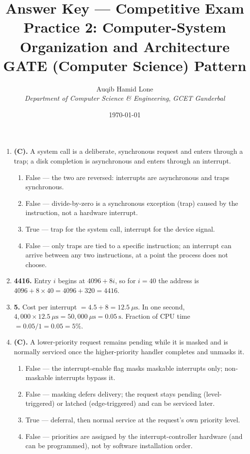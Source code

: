 \documentclass[11pt]{article}
\title{Answer Key --- Competitive Exam Practice 2: Computer-System Organization and Architecture\\\large GATE (Computer Science) Pattern}
\author{Auqib Hamid Lone\\[0.3em]
  \emph{Department of Computer Science \& Engineering}, \emph{GCET Ganderbal}}
\date{\today}
\begin{document}
\maketitle

\begin{enumerate}
\item[\textbf{Q1}] \textbf{(C).} A system call is a deliberate, synchronous request and enters through a trap; a disk completion is asynchronous and enters through an interrupt.

\begin{enumerate}
  \item[(A)] False --- the two are reversed: interrupts are asynchronous and traps synchronous.
  \item[(B)] False --- divide-by-zero is a synchronous exception (trap) caused by the instruction, not a hardware interrupt.
  \item[(C)] True --- trap for the system call, interrupt for the device signal.
  \item[(D)] False --- only traps are tied to a specific instruction; an interrupt can arrive between any two instructions, at a point the process does not choose.
\end{enumerate}

\item[\textbf{Q2}] \textbf{4416.} Entry $i$ begins at $4096 + 8i$, so for $i = 40$ the address is $4096 + 8 \times 40 = 4096 + 320 = 4416$.

\item[\textbf{Q3}] \textbf{5.} Cost per interrupt $= 4.5 + 8 = 12.5\ \mu\text{s}$. In one second, $4{,}000 \times 12.5\ \mu\text{s} = 50{,}000\ \mu\text{s} = 0.05\ \text{s}$. Fraction of CPU time $= 0.05/1 = 0.05 = 5\%$.

\item[\textbf{Q4}] \textbf{(C).} A lower-priority request remains pending while it is masked and is normally serviced once the higher-priority handler completes and unmasks it.

\begin{enumerate}
  \item[(A)] False --- the interrupt-enable flag masks maskable interrupts only; non-maskable interrupts bypass it.
  \item[(B)] False --- masking defers delivery; the request stays pending (level-triggered) or latched (edge-triggered) and can be serviced later.
  \item[(C)] True --- deferral, then normal service at the request's own priority level.
  \item[(D)] False --- priorities are assigned by the interrupt-controller hardware (and can be programmed), not by software installation order.
\end{enumerate}


\end{enumerate}
\end{document}
